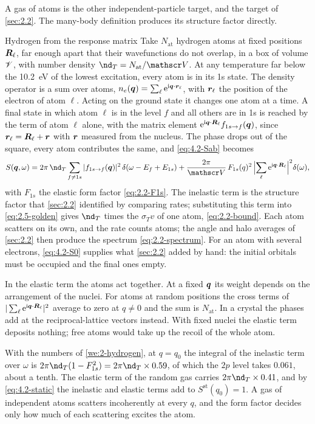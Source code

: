 A gas of atoms is the other independent-particle target, and the target of \cref{sec:2.2}. The many-body definition produces its structure factor directly.

\begin{workedexample}{Hydrogen from the response matrix}\label{we:4-hydrogen}
Take $N_{\mathrm{at}}$ hydrogen atoms at fixed positions $\bm{R}_\ell$, far enough apart that their wavefunctions do not overlap, in a box of volume $\mathscr{V}$, with number density $\nd_T = N_{\mathrm{at}}/\Vol$. At any temperature far below the \SI{10.2}{eV} of the lowest excitation, every atom is in its 1s state. The density operator is a sum over atoms, $n_e(\bm{q}) = \sum_\ell\mathrm{e}^{\mathrm{i}\bm{q}\cdot\bm{r}_\ell}$, with $\bm{r}_\ell$ the position of the electron of atom $\ell$. Acting on the ground state it changes one atom at a time. A final state in which atom $\ell$ is in the level $f$ and all others are in 1s is reached by the term of atom $\ell$ alone, with the matrix element $\mathrm{e}^{\mathrm{i}\bm{q}\cdot\bm{R}_\ell}f_{1s\to f}(\bm{q})$, since $\bm{r}_\ell = \bm{R}_\ell + \bm{r}$ with $\bm{r}$ measured from the nucleus. The phase drops out of the square, every atom contributes the same, and \cref{eq:4.2-Sab} becomes
\begin{equation}
  S(\vect{q},\omega) = 2\pi\,\nd_T\sum_{f\ne 1s}|f_{1s\to f}(\vect{q})|^2\,\delta(\omega - E_f + E_{1s}) + \frac{2\pi}{\Vol}\,F_{1s}(q)^2\,\Bigl|\sum_\ell\ee^{\ii\vect{q}\cdot\vect{R}_\ell}\Bigr|^2\delta(\omega) ,
  \label{eq:4.2-hydrogen}
\end{equation}
with $F_{1s}$ the elastic form factor \cref{eq:2.2-F1s}. The inelastic term is the structure factor that \cref{sec:2.2} identified by comparing rates; substituting this term into \cref{eq:2.5-golden} gives $\nd_T$ times the $\sigma_Tv$ of one atom, \cref{eq:2.2-bound}. Each atom scatters on its own, and the rate counts atoms; the angle and halo averages of \cref{sec:2.2} then produce the spectrum \cref{eq:2.2-spectrum}. For an atom with several electrons, \cref{eq:4.2-S0} supplies what \cref{sec:2.2} added by hand: the initial orbitals must be occupied and the final ones empty.

In the elastic term the atoms act together. At a fixed $\bm{q}$ its weight depends on the arrangement of the nuclei. For atoms at random positions the cross terms of $|\sum_\ell\mathrm{e}^{\mathrm{i}\bm{q}\cdot\bm{R}_\ell}|^2$ average to zero at $q \ne 0$ and the sum is $N_{\mathrm{at}}$. In a crystal the phases add at the reciprocal-lattice vectors instead. With fixed nuclei the elastic term deposits nothing; free atoms would take up the recoil of the whole atom.

With the numbers of \cref{we:2-hydrogen}, at $q = q_0$ the integral of the inelastic term over $\omega$ is $2\pi\nd_T(1 - F_{1s}^2) = 2\pi\nd_T \times 0.59$, of which the $2p$ level takes $0.061$, about a tenth. The elastic term of the random gas carries $2\pi\nd_T \times 0.41$, and by \cref{eq:4.2-static} the inelastic and elastic terms add to $S^{\mathrm{st}}(q_0) = 1$. A gas of independent atoms scatters incoherently at every $q$, and the form factor decides only how much of each scattering excites the atom.
\end{workedexample}
